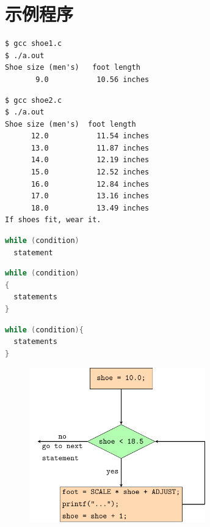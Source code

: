 \section{示例程序}

\begin{frame}[fragile]\ft{\secname}
 

\end{frame}


\begin{frame}[fragile]\ft{\secname}
\begin{lstlisting}[backgroundcolor=\color{red!10}]
$ gcc shoe1.c
$ ./a.out 
Shoe size (men's)   foot length
       9.0           10.56 inches
\end{lstlisting}
\end{frame}


\begin{frame}\ft{\secname}
 
\end{frame}



\begin{frame}[fragile]\ft{\secname}
\begin{lstlisting}[backgroundcolor=\color{red!10}]
$ gcc shoe2.c
$ ./a.out 
Shoe size (men's)  foot length
      12.0           11.54 inches
      13.0           11.87 inches
      14.0           12.19 inches
      15.0           12.52 inches
      16.0           12.84 inches
      17.0           13.16 inches
      18.0           13.49 inches
If shoes fit, wear it.
\end{lstlisting}
\end{frame}


\begin{frame}[fragile]
\begin{lstlisting}[language=c,frame=single]
while (condition)
  statement
\end{lstlisting}

\begin{lstlisting}[language=c,frame=single]
while (condition)
{
  statements
}
\end{lstlisting}

\begin{lstlisting}[language=c,frame=single]
while (condition){
  statements
}
\end{lstlisting}


\end{frame}


\begin{frame}[fragile]
\begin{figure}
\centering
\includegraphics[width=3in]{ch05/images/while.pdf}
\end{figure}
\end{frame}
